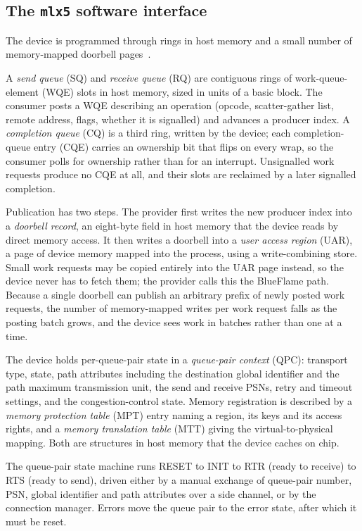 \subsection{The \texttt{mlx5} software interface}

The device is programmed through rings in host memory and a small number of
memory-mapped doorbell pages~\cite{mlx-prm,rdma-core}.

A \emph{send queue} (SQ) and \emph{receive queue} (RQ) are contiguous rings of
work-queue-element (WQE) slots in host memory, sized in units of a basic block.
The consumer posts a WQE describing an operation (opcode, scatter-gather list,
remote address, flags, whether it is signalled) and advances a producer index.
A \emph{completion queue} (CQ) is a third ring, written by the device; each
completion-queue entry (CQE) carries an ownership bit that flips on every wrap,
so the consumer polls for ownership rather than for an interrupt. Unsignalled
work requests produce no CQE at all, and their slots are reclaimed by a later
signalled completion.

Publication has two steps. The provider first writes the new producer index
into a \emph{doorbell record}, an eight-byte field in host memory that the
device reads by direct memory access. It then writes a doorbell into a
\emph{user access region} (UAR), a page of device memory mapped into the
process, using a write-combining store. Small work requests may be copied
entirely into the UAR page instead, so the device never has to fetch them; the
provider calls this the BlueFlame path. Because a single doorbell can publish
an arbitrary prefix of newly posted work requests, the number of memory-mapped
writes per work request falls as the posting batch grows, and the device sees
work in batches rather than one at a time.

The device holds per-queue-pair state in a \emph{queue-pair context} (QPC):
transport type, state, path attributes including the destination global
identifier and the path maximum transmission unit, the send and receive PSNs,
retry and timeout settings, and the congestion-control state. Memory
registration is described by a \emph{memory protection table} (MPT) entry
naming a region, its keys and its access rights, and a \emph{memory
translation table} (MTT) giving the virtual-to-physical mapping. Both are
structures in host memory that the device caches on chip.

The queue-pair state machine runs RESET to INIT to RTR (ready to receive) to
RTS (ready to send), driven either by a manual exchange of queue-pair number,
PSN, global identifier and path attributes over a side channel, or by the
connection manager. Errors move the queue pair to the error state, after which
it must be reset.

